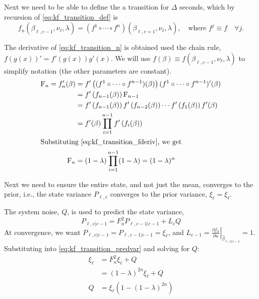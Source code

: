 \documentclass[english]{MastersDoctoralThesis}\usepackage[]{graphicx}\usepackage[]{color}
\begin{document}
Next we need to be able to define the a transition for $\Delta$ seconds,
which by recursion of \ref{eq:kf_transition_def} is
\begin{equation}
    \label{eq:kf_transition_n}
    f_n(\beta_{\ell,c-1}, \nu_\ell, \lambda) =
    (f^1 \circ \cdots \circ f^n)(\beta_{\ell,c=1}, \nu_\ell, \lambda), \quad\text{where } f^j\equiv f\quad \forall j.
\end{equation}

The derivative of \ref{eq:kf_transition_n} is obtained used the chain rule,
$f(g(x))' = f'(g(x)) g'(x)$.
We will use $f(\beta) \equiv f(\beta_{\ell,c-1},\nu_\ell,\lambda)$ to simplify notation
(the other parameters are constant).
\begin{align}
    \label{eq:kf_transition_F}
    \mathrm{F}_n = f'_n(\beta) &=
    f'\left((f^1\circ\cdots\circ f^{n-1})(\beta)\right)(f^1\circ\cdots\circ f^{n-1})'(\beta) \nonumber \\
    &= f'\left(f_{n-1}(\beta)\right) \mathrm{F}_{n-1} \nonumber \\
    &= f'\left(f_{n-1}(\beta)\right) f'\left(f_{n-2}(\beta)\right) \cdots f'\left(f_1(\beta)\right) f'(\beta) \nonumber \\
    &= f'(\beta) \prod_{i=1}^{n-1} f'\left(f_i(\beta)\right) \nonumber \\
\intertext{Substituting \ref{eq:kf_transition_fderiv}, we get}
    \mathrm{F}_n &= (1-\lambda) \prod_{i=1}^{n-1}(1-\lambda) = (1-\lambda)^n
\end{align}


Next we need to ensure the entire state, and not just the mean,
converges to the prior,
i.e., the state variance $P_{\ell,c}$ converges to the prior variance, $\xi_{\ell} = \xi_\ell$.

The system noise, $Q$, is used to predict the state variance,
\begin{equation}
    \label{eq:kf_transition_predvar}
    P_{\ell,c|c-1} = F_n^2 P_{\ell,c-1|c-1} + L_c Q
\end{equation}
At convergence, we want $P_{\ell,c|c-1} = P_{\ell,c-1|c-1} = \xi_\ell$, and
$L_{c-1} = \left.\frac{\partial f_n}{\partial u}\right|_{\hat\beta_{\ell,c|c-1}} = 1$.
Substituting into \ref{eq:kf_transition_predvar} and solving for $Q$:
\begin{align}
    \label{eq:kf_transition_Q}
    \xi_\ell &= F^2_n\xi_\ell + Q \nonumber \\
    &= (1-\lambda)^{2n}\xi_\ell + Q \nonumber \\
    Q &= \xi_\ell(1 - (1 - \lambda)^{2n})
\end{align}
\end{document}
